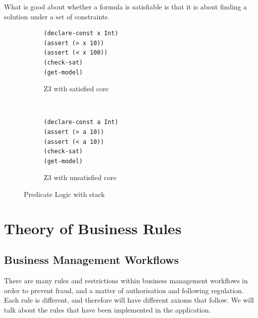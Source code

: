 \documentclass[a4paper]{report}
\begin{document}
What is good about whether a formula is satisfiable is that it is about finding a solution under a set of constraints. 
\begin{figure}[!htb]
\centering
\begin{subfigure}[b]{\textwidth}
\lstset{numbers=left, showspaces=false,
    showstringspaces=false, tabsize=2, breaklines=true,
    xleftmargin=5.0ex,
}
\centering
\begin{lstlisting}[frame=single]
(declare-const x Int)
(assert (> x 10))
(assert (< x 100))
(check-sat)
(get-model)
\end{lstlisting}
\caption{Z3 with satisfied core}
\label{fig:Z3 with satisfied core}
\end{subfigure}\\
\begin{subfigure}[b]{\textwidth}
\lstset{numbers=left, showspaces=false,
    showstringspaces=false, tabsize=2, breaklines=true,
    xleftmargin=5.0ex,
}
\begin{lstlisting}[frame=single]
(declare-const a Int)
(assert (> a 10))
(assert (< a 10))
(check-sat)
(get-model)
\end{lstlisting}
\caption{Z3 with unsatisfied core}
\label{fig:Z3 with unsatisfied core}
\end{subfigure}
\caption{Predicate Logic with stack}
\label{fig:Predicate Logic with stack}
\end{figure} 

\chapter{Theory of Business Rules}
\section{Business Management Workflows}
There are many rules and restrictions within business management workflows in order to prevent fraud, and a matter of authorisation and following regulation. Each rule is different, and therefore will have different axioms that follow. We will talk about the rules that have been implemented in the application.
\end{document}
